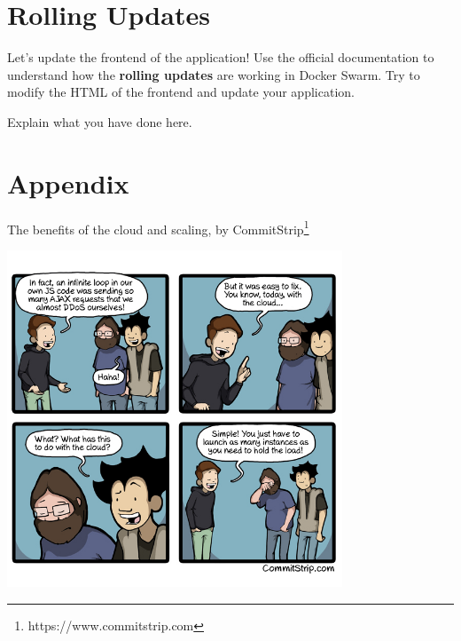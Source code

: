 \documentclass[a4paper,11pt]{exam}
\begin{document}
\section{Rolling Updates}

Let's update the frontend of the application! Use the official documentation to understand how the \textbf{rolling updates} are working in Docker Swarm. Try to modify the HTML of the frontend and update your application.
\begin{questions}
	\question Explain what you have done here.
\end{questions}

\section{Appendix}

The benefits of the cloud and scaling, by CommitStrip\footnote{https://www.commitstrip.com}
\begin{center}
	\includegraphics[width=10cm]{fig/commitstripcloudscale.jpg}	
\end{center}
\end{document}
